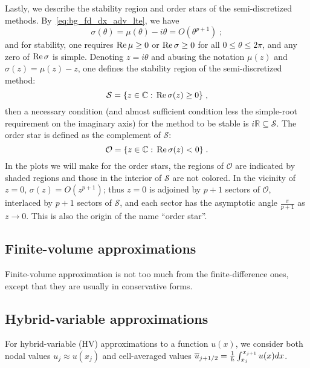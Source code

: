 Lastly, we describe the stability region and order stars of the semi-discretized methods.
By~\cref{eq:bg_fd_dx_adv_lte}, we have
\begin{equation}\label{eq:bg_fd_dx_mu_order}
  \sigma(\theta) = \mu(\theta) - i\theta = O(\theta^{p+1})\;;
\end{equation}
and for stability, one requires $\operatorname{Re}\mu\ge0$ or $\operatorname{Re}\sigma\ge0$ for all $0\le\theta\le2\pi$, and any zero of $\operatorname{Re}\sigma$ is simple.
Denoting $z=i\theta$ and abusing the notation $\mu(z)$ and $\sigma(z)=\mu(z)-z$, one defines the stability region of the semi-discretized method:
\begin{equation}\label{eq:bg_fd_dx_mu_stab}
  \mathcal{S} = \{z\in\mathbb{C}:\,\operatorname{Re}\sigma(z)\ge0\}\;,
\end{equation}
then a necessary condition (and almost sufficient condition less the simple-root requirement on the imaginary axis) for the method to be stable is $i\mathbb{R}\subseteq\mathcal{S}$.
The order star is defined as the complement of $\mathcal{S}$:
\begin{equation}\label{eq:bg_fd_dx_mu_os}
  \mathcal{O} = \{z\in\mathbb{C}:\,\operatorname{Re}\sigma(z)<0\}\;.
\end{equation}
In the plots we will make for the order stars, the regions of $\mathcal{O}$ are indicated by shaded regions and those in the interior of $\mathcal{S}$ are not colored.
In the vicinity of $z=0$, $\sigma(z)=O(z^{p+1})$; thus $z=0$ is adjoined by $p+1$ sectors of $\mathcal{O}$, interlaced by $p+1$ sectors of $\mathcal{S}$, and each sector has the asymptotic angle $\frac{\pi}{p+1}$ as $z\to0$.
This is also the origin of the name ``order star''.

\subsection{Finite-volume approximations}
\label{sec:bg_fv}
Finite-volume approximation is not too much from the finite-difference ones, except that they are usually in conservative forms.

\subsection{Hybrid-variable approximations}
\label{sec:bg_hv}
For hybrid-variable (HV) approximations to a function $u(x)$, we consider both nodal values $u_j\approx u(x_j)$ and cell-averaged values $\overline{u}_{{{j}+1/2}}=\frac{1}{h}\int_{x_j}^{x_{j+1}}u(x)dx$.

